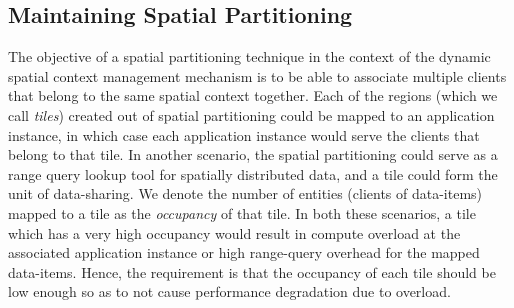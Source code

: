 \subsection{Maintaining Spatial Partitioning}
The objective of a spatial partitioning technique in the context of the dynamic spatial context management mechanism is to be able to associate multiple clients that belong to the same spatial context together. Each of the regions (which we call \textit{tiles}) created out of spatial partitioning could be mapped to an application instance, in which case each application instance would serve the clients that belong to that tile. In another scenario, the spatial partitioning could serve as a range query lookup tool for spatially distributed data, and a tile could form the unit of data-sharing. We denote the number of entities (clients of data-items) mapped to a tile as the \textit{occupancy} of that tile. In both these scenarios, a tile which has a very high occupancy would result in compute overload at the associated application instance or high range-query overhead for the mapped data-items. Hence, the requirement is that the occupancy of each tile should be low enough so as to not cause performance degradation due to overload. 
